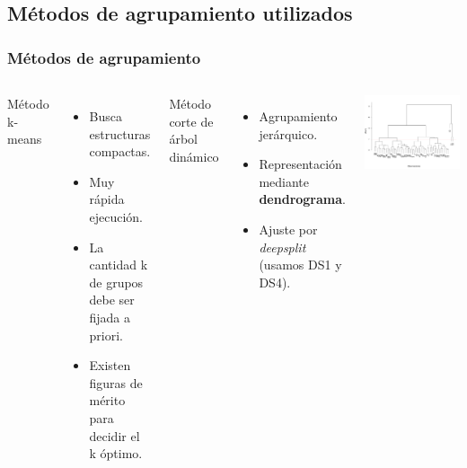 \documentclass[serif,9pt, t]{beamer}
\begin{document}
\subsection{Métodos de agrupamiento utilizados}
\begin{frame}\frametitle{Métodos de agrupamiento} 
\begin{columns}[T]
\small
{}
Método k-means\\
\begin{itemize}
	\item Busca estructuras compactas.
	\item Muy rápida ejecución. 
	\item La cantidad k de grupos debe ser fijada a priori.  
	\item Existen figuras de mérito para decidir el k óptimo.
\end{itemize}
\bigskip
\bigskip
Método corte de árbol dinámico\\
\begin{itemize}
	\item Agrupamiento jerárquico.
	\item Representación mediante \textbf{dendrograma}.
	\item Ajuste por \textit{deepsplit} (usamos DS1 y DS4).
\end{itemize}			
    \centering
    \vspace{-10pt}
    \includegraphics[width=1.1\textwidth, height=1\textheight]{dendrograma_muestra.pdf}
\end{columns}
\end{frame}
\end{document}
